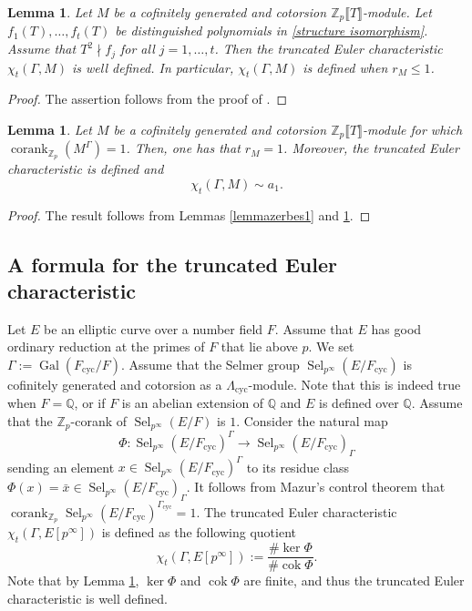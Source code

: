 \documentclass[12pt]{amsart}
\newtheorem{lemma}[theorem]{Lemma}
\newcommand{\Z}{\mathbb{Z}}
\newcommand{\Q}{\mathbb{Q}}
\newcommand{\op}[1]{\operatorname{#1}}
\numberwithin{equation}{section}
\begin{document}
\begin{lemma}\label{lemma zerbes2}
    Let $M$ be a cofinitely generated and cotorsion $\Z_p\llbracket T\rrbracket$-module. Let $f_1(T), \dots, f_t(T)$ be distinguished polynomials in \eqref{structure isomorphism}. Assume that $T^2\nmid f_j$ for all $j=1, \dots, t$. Then the truncated Euler characteristic $\chi_t(\Gamma, M)$ is well defined. In particular, $\chi_t(\Gamma, M)$ is defined when $r_M\leq 1$. 
\end{lemma}
\begin{proof}
    The assertion follows from the proof of \cite[Lemma 2.11]{zerbes09}.
\end{proof}

\begin{lemma}\label{TEC is well defined}
    Let $M$ be a cofinitely generated and cotorsion $\Z_p\llbracket T\rrbracket$-module for which $\op{corank}_{\Z_p}(M^\Gamma)= 1$. Then, one has that $r_M=1$. Moreover, the truncated Euler characteristic is defined and 
    \[\chi_t(\Gamma, M)\sim a_1.\]
\end{lemma}
\begin{proof}
    The result follows from Lemmas \ref{lemmazerbes1} and \ref{lemma zerbes2}.
\end{proof}

\subsection{A formula for the truncated Euler characteristic}
\par Let $E$ be an elliptic curve over a number field $F$. Assume that $E$ has good ordinary reduction at the primes of $F$ that lie above $p$. We set $\Gamma:=\op{Gal}(F_{\op{cyc}}/F)$. Assume that the Selmer group $\op{Sel}_{p^\infty}(E/F_{\op{cyc}})$ is cofinitely generated and cotorsion as a $\Lambda_{\op{cyc}}$-module. Note that this is indeed true when $F=\Q$, or if $F$ is an abelian extension of $\Q$ and $E$ is defined over $\Q$. Assume that the $\Z_p$-corank of $\op{Sel}_{p^\infty}(E/F)$ is $1$. Consider the natural map
\[\Phi: \op{Sel}_{p^\infty} (E/F_{\op{cyc}})^\Gamma\rightarrow \op{Sel}_{p^\infty} (E/F_{\op{cyc}})_{\Gamma}\]
sending an element $x\in \op{Sel}_{p^\infty} (E/F_{\op{cyc}})^\Gamma$ to its residue class $\Phi(x)=\bar{x}\in \op{Sel}_{p^\infty} (E/F_{\op{cyc}})_{\Gamma}$. It follows from Mazur's control theorem that $\op{corank}_{\Z_p}\op{Sel}_{p^\infty}(E/F_{\op{cyc}})^{\Gamma_{\op{cyc}}}=1$.
The truncated Euler characteristic $\chi_t(\Gamma, E[p^\infty])$ is defined as the following quotient
\[\chi_t(\Gamma, E[p^\infty]):=\frac{\# \op{ker}\Phi}{\#\op{cok} \Phi}.\] 
Note that by Lemma \ref{TEC is well defined}, $\op{ker}\Phi$ and $\op{cok}\Phi$ are finite, and thus the truncated Euler characteristic is well defined.
\end{document}
